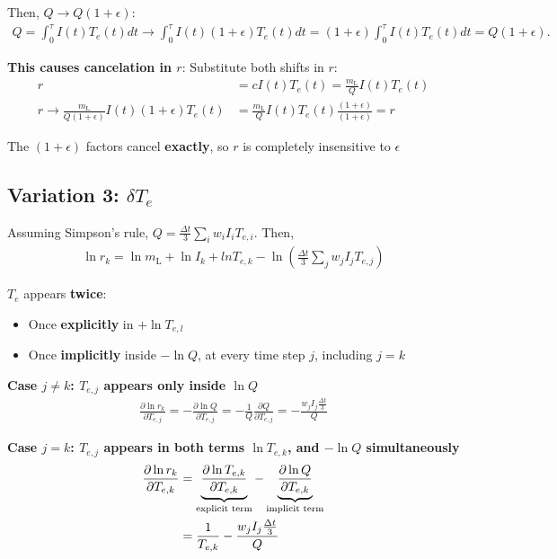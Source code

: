 \documentclass[11pt,twoside]{article}
\begin{document}
Then, $Q \to Q(1+\epsilon)$:
\begin{align*}
Q = \int_0^{\tau} I(t) T_e(t) dt \to \int_0^{\tau} I(t) (1 + \epsilon) T_e(t) dt
= (1 + \epsilon)\int_0^{\tau} I(t)  T_e(t) dt = Q (1 + \epsilon).
\end{align*}

\textbf{This causes cancelation in $r$}:
Substitute both shifts in $r$:
\begin{align*}
r &= c I(t) T_e(t) = \frac{m_{\mathrm{L}}}{Q} I(t)T_e(t) \\
r \to \frac{m_{\mathrm{L}}}{Q(1+\epsilon)} I(t)(1+\epsilon)T_e(t)
&= \frac{m_{\mathrm{L}}}{Q} I(t)T_e(t) \frac{(1+\epsilon)}{(1+\epsilon)} = r
\end{align*}

The $(1+\epsilon)$ factors cancel \textbf{exactly}, so $r$ is completely insensitive to $\epsilon$

\subsection{Variation 3: $\delta T_{e}$}
Assuming Simpson's rule, $Q = \frac{\Delta t}{3}\sum_{i}w_iI_iT_{e,i}$. Then,
\begin{align}
\ln r_k = \ln m_{\mathrm{L}} + \ln I_k + ln T_{e,k} - \ln \left(\frac{\Delta t}{3}\sum_{j}w_jI_jT_{e,j} \right)
\end{align}

$T_e$ appears \textbf{twice}:
\begin{itemize}
    \item Once \textbf{explicitly} in $+\ln T_{e,l}$
    \item Once \textbf{implicitly} inside $-\ln Q$, at every time step $j$, including $j=k$
\end{itemize}

\textbf{Case $j \neq k$: $T_{e,j}$ appears only inside $\ln Q$}
\begin{align}
\frac{\partial \ln r_k}{\partial T_{e,j}} = -\frac{\partial \ln Q}{\partial T_{e,j}} = -\frac{1}{Q}\frac{\partial Q}{\partial T_{e,j}} = - \frac{w_j I_j \frac{\Delta t}{3}}{Q} \tag{9}
\end{align}

\textbf{Case $j = k$: $T_{e,j}$ appears in both terms $\ln T_{e,k}$, and $-\ln Q$ simultaneously}
\begin{align}
\frac{\partial \ln r_k}{\partial T_{e,k}} &= \underbrace{\frac{\partial \ln T_{e,k}}{\partial T_{e,k}}}_{\text{explicit term}} -\underbrace{\frac{\partial \ln Q}{\partial T_{e,k}}}_{\text{implicit term}} \notag \\
&= \frac{1}{T_{e,k}} - \frac{w_j I_j \frac{\Delta t}{3}}{Q}
\end{align}
\end{document}
